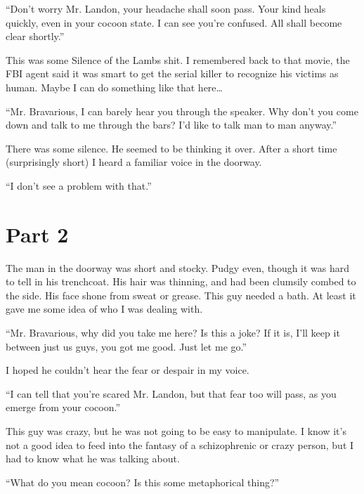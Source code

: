 ``Don't worry Mr. Landon, your headache shall soon pass.
Your kind heals quickly, even in your cocoon state. I can see
you're confused. All shall become clear shortly.''



This was some Silence of the Lambs shit. I remembered back to that
movie, the FBI agent said it was smart to get the serial killer to
recognize his victims as human. Maybe I can do something like that
here{\ldots}



``Mr. Bravarious, I can barely hear you through the speaker.
Why don't you come down and talk to me through the bars?
I'd like to talk man to man anyway.''



There was some silence. He seemed to be thinking it over. After a
short time (surprisingly short) I heard a familiar voice in the
doorway.



``I don't see a problem with that.'' 

\section*{Part 2} 

The man in the doorway was short and stocky. Pudgy even, though it
was hard to tell in his trenchcoat. His hair was thinning, and had
been clumsily combed to the side. His face shone from sweat or
grease. This guy needed a bath. At least it gave me some idea of
who I was dealing with.



``Mr. Bravarious, why did you take me here? Is this a joke? If
it is, I'll keep it between just us guys, you got me good.
Just let me go.''



I hoped he couldn't hear the fear or despair in my
voice.



``I can tell that you're scared Mr. Landon, but that
fear too will pass, as you emerge from your cocoon.''



This guy was crazy, but he was not going to be easy to manipulate.
I know it's not a good idea to feed into the fantasy of a
schizophrenic or crazy person, but I had to know what he was
talking about.



``What do you mean cocoon? Is this some metaphorical
thing?''




